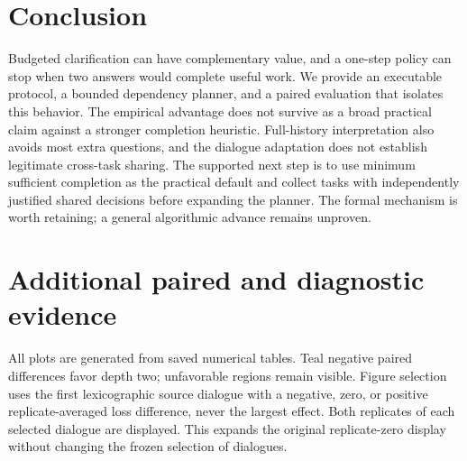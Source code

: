 \documentclass[11pt]{article}
\begin{document}
\section{Conclusion}
Budgeted clarification can have complementary value, and a one-step policy can stop when two answers would complete useful work. We provide an executable protocol, a bounded dependency planner, and a paired evaluation that isolates this behavior. The empirical advantage does not survive as a broad practical claim against a stronger completion heuristic. Full-history interpretation also avoids most extra questions, and the dialogue adaptation does not establish legitimate cross-task sharing. The supported next step is to use minimum sufficient completion as the practical default and collect tasks with independently justified shared decisions before expanding the planner. The formal mechanism is worth retaining; a general algorithmic advance remains unproven.

\appendix
\section{Additional paired and diagnostic evidence}
All plots are generated from saved numerical tables. Teal negative paired differences favor depth two; unfavorable regions remain visible. Figure selection uses the first lexicographic source dialogue with a negative, zero, or positive replicate-averaged loss difference, never the largest effect. Both replicates of each selected dialogue are displayed. This expands the original replicate-zero display without changing the frozen selection of dialogues.
\end{document}
